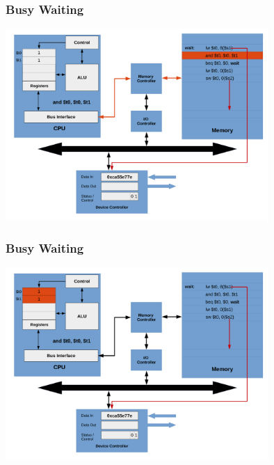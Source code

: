 \documentclass{beamer}
\begin{document}
\begin{frame}%
\frametitle{Busy Waiting}

\vspace*{-0.2cm}
\begin{center}
\hspace*{-1cm}\includegraphics[width=10cm]{busy_waiting13.pdf}
\end{center}

\end{frame}

\begin{frame}%
\frametitle{Busy Waiting}

\vspace*{-0.2cm}
\begin{center}
\hspace*{-1cm}\includegraphics[width=10cm]{busy_waiting14.pdf}
\end{center}

\end{frame}
\end{document}
